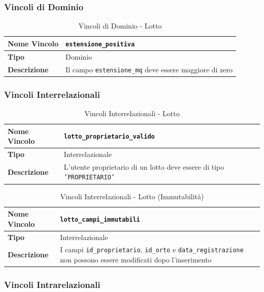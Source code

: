 \documentclass[12pt,a4paper]{article}
\begin{document}
\subsubsection{Vincoli di Dominio}

\begin{table}[H]
\centering
\caption{Vincoli di Dominio - Lotto}
\begin{tabularx}{\textwidth}{|l|X|}
\hline
\textbf{Nome Vincolo} & \texttt{estensione\_positiva} \\
\hline
\textbf{Tipo} & Dominio \\
\hline
\textbf{Descrizione} & Il campo \texttt{estensione\_mq} deve essere maggiore di zero \\
\hline
\end{tabularx}
\end{table}

\subsubsection{Vincoli Interrelazionali}

\begin{table}[H]
\centering
\caption{Vincoli Interrelazionali - Lotto}
\begin{tabularx}{\textwidth}{|l|X|}
\hline
\textbf{Nome Vincolo} & \texttt{lotto\_proprietario\_valido} \\
\hline
\textbf{Tipo} & Interrelazionale \\
\hline
\textbf{Descrizione} & L'utente proprietario di un lotto deve essere di tipo \texttt{'PROPRIETARIO'} \\
\hline
\end{tabularx}
\end{table}

\begin{table}[H]
\centering
\caption{Vincoli Interrelazionali - Lotto (Immutabilità)}
\begin{tabularx}{\textwidth}{|l|X|}
\hline
\textbf{Nome Vincolo} & \texttt{lotto\_campi\_immutabili} \\
\hline
\textbf{Tipo} & Interrelazionale \\
\hline
\textbf{Descrizione} & I campi \texttt{id\_proprietario}, \texttt{id\_orto} e \texttt{data\_registrazione} non possono essere modificati dopo l'inserimento \\
\hline
\end{tabularx}
\end{table}

\subsubsection{Vincoli Intrarelazionali}
\end{document}
